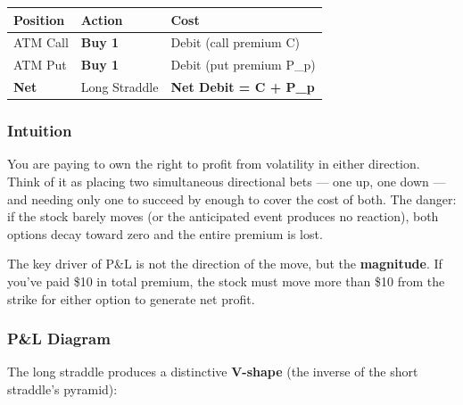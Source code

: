 \documentclass[12pt,openany]{book}
\begin{document}
\begin{center}
\scriptsize
\setlength{\tabcolsep}{3pt}
\begin{tabular}{|L{4.42cm}|L{4.42cm}|L{4.42cm}|}
\hline
Position & Action & Cost \\
\hline
ATM Call & \textbf{Buy 1} & Debit (call premium C) \\
\hline
ATM Put & \textbf{Buy 1} & Debit (put premium P\_p) \\
\hline
\textbf{Net} & Long Straddle & \textbf{Net Debit = C + P\_p} \\
\hline
\end{tabular}
\end{center}



\subsubsection{Intuition}

You are paying to own the right to profit from volatility in either direction. Think of it as placing two simultaneous directional bets — one up, one down — and needing only one to succeed by enough to cover the cost of both. The danger: if the stock barely moves (or the anticipated event produces no reaction), both options decay toward zero and the entire premium is lost.

The key driver of P\&L is not the direction of the move, but the \textbf{magnitude}. If you've paid \$10 in total premium, the stock must move more than \$10 from the strike for either option to generate net profit.



\subsubsection{P\&L Diagram}

The long straddle produces a distinctive \textbf{V-shape} (the inverse of the short straddle's pyramid):
\end{document}
